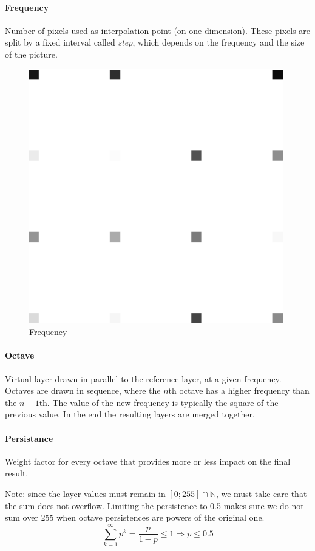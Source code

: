 \documentclass[10pt,a4paper]{article}
\begin{document}
\paragraph{Frequency}
Number of pixels used as interpolation point (on one dimension). These pixels
are split by a fixed interval called \emph{step}, which depends on the frequency
and the size of the picture.

\begin{figure}[p]
  \centering
  \caption{Frequency}
  \bigskip
  \includegraphics[scale=0.8]{interpol_bil_step1}
\end{figure}

\paragraph{Octave}
Virtual layer drawn in parallel to the reference layer, at a given frequency.
Octaves are drawn in sequence, where the $n$th octave has a higher frequency
than the $n-1$th. The value of the new frequency is typically the square of the
previous value. In the end the resulting layers are merged together.

\paragraph{Persistance}
Weight factor for every octave that provides more or less impact on the final
result.

\bigskip
Note: since the layer values must remain in $[0;255]\cap \mathbb{N}$, we must take care that
the sum does not overflow. Limiting the persistence to 0.5 makes sure we do not sum
over 255 when octave persistences are powers of the original one.
\[
\sum_{k=1}^{\infty} p^k= \frac {p} {1-p} \leqslant 1 \Rightarrow p \leqslant 0.5
\]
\end{document}
